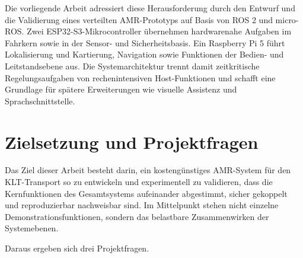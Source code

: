 Die vorliegende Arbeit adressiert diese Herausforderung durch den Entwurf und die Validierung eines verteilten AMR-Prototyps auf Basis von ROS 2 und micro-ROS. Zwei ESP32-S3-Mikrocontroller übernehmen hardwarenahe Aufgaben im Fahrkern sowie in der Sensor- und Sicherheitsbasis. Ein Raspberry Pi 5 führt Lokalisierung und Kartierung, Navigation sowie Funktionen der Bedien- und Leitstandsebene aus. Die Systemarchitektur trennt damit zeitkritische Regelungsaufgaben von rechenintensiven Host-Funktionen und schafft eine Grundlage für spätere Erweiterungen wie visuelle Assistenz und Sprachschnittstelle.

\section{Zielsetzung und Projektfragen}

Das Ziel dieser Arbeit besteht darin, ein kostengünstiges AMR-System für den KLT-Transport so zu entwickeln und experimentell zu validieren, dass die Kernfunktionen des Gesamtsystems aufeinander abgestimmt, sicher gekoppelt und reproduzierbar nachweisbar sind. Im Mittelpunkt stehen nicht einzelne Demonstrationsfunktionen, sondern das belastbare Zusammenwirken der Systemebenen.

Daraus ergeben sich drei Projektfragen.

